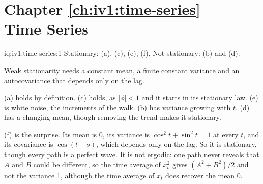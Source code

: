 \section*{Chapter \ref{ch:iv1:time-series} --- Time Series}

\begin{solution}{iq:iv1:time-series:1}
Stationary: (a), (c), (e), (f). Not stationary: (b) and (d).

Weak stationarity needs a constant mean, a finite constant variance and an autocovariance that depends only on the lag.

(a) holds by definition. (c) holds, as $|\phi| < 1$ and it starts in its stationary law. (e) is white noise, the increments of the walk. (b) has variance growing with $t$. (d) has a changing mean, though removing the trend makes it stationary.

(f) is the surprise. Its mean is 0, its variance is $\cos^2t + \sin^2t = 1$ at every $t$, and its covariance is $\cos(t - s)$, which depends only on the lag. So it is stationary, though every path is a perfect wave. It is not ergodic: one path never reveals that $A$ and $B$ could be different, so the time average of $x_t^2$ gives $(A^2 + B^2)/2$ and not the variance 1, although the time average of $x_t$ does recover the mean 0.



\end{solution}

